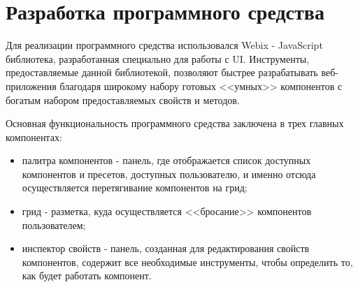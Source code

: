 \section{Разработка программного средства} 
\label{sec:development}

Для реализации программного средства использовался Webix - JavaScript библиотека, разработанная специально для работы с UI. Инструменты, предоставляемые данной библиотекой, позволяют быстрее разрабатывать веб-приложения благодаря широкому набору готовых <<умных>> компонентов с богатым набором предоставляемых свойств и методов.

Основная функциональность программного средства заключена в трех главных компонентах: 
\begin{itemize}
	\item палитра компонентов - панель, где отображается список доступных компонентов и пресетов, доступных пользователю, и именно отсюда осуществляется перетягивание компонентов на грид;
	\item грид - разметка, куда осуществляется <<бросание>> компонентов пользователем;
	\item инспектор свойств - панель, созданная для редактирования свойств компонентов, содержит все необходимые инструменты, чтобы определить то, как будет работать компонент.
\end{itemize}







